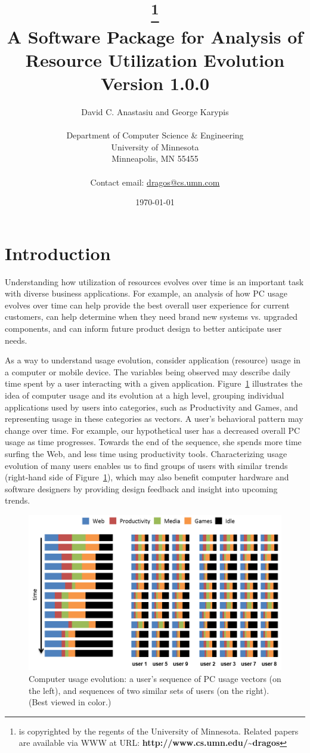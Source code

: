\documentclass[]{article}
\title{{\Huge \orion}\thanks{%
\orion is copyrighted by the regents of the University of Minnesota.
Related papers are available via WWW at URL: {\bf\sf
http://www.cs.umn.edu/\~{}dragos} }\\%
 {\LARGE A Software Package for Analysis of Resource Utilization Evolution}\\
 {\Large Version 1.0.0}}
\author{David C. Anastasiu and George Karypis \\ \\
	Department of Computer Science \& Engineering\\University of
Minnesota\\ Minneapolis, MN 55455 \\ \\ Contact email:
\href{mailto:dragos@cs.umn.com}{dragos@cs.umn.com} }
\date\today
\begin{document}
\maketitle
\clearpage

\tableofcontents
\clearpage



\section{Introduction}

Understanding how utilization of resources evolves over time is an important
task with diverse business applications. For example, an analysis of how PC
usage evolves over time can help provide the best overall user experience for
current customers, can help determine when they need brand new systems vs.
upgraded components, and can inform future product design to better anticipate
user needs.

As a way to understand usage evolution, consider application (resource) usage in
a computer or mobile device. The variables being observed may describe daily time
spent by a user interacting with a given application.
Figure~\ref{fig:usage-evolution} illustrates the idea of computer usage and its
evolution at a high level, grouping individual applications used by users into
categories, such as Productivity and Games, and representing usage in these
categories as vectors. A user's behavioral pattern may change over time. For
example, our hypothetical user has a decreased overall PC usage as time
progresses. Towards the end of the sequence, she spends more time surfing the
Web, and less time using productivity tools. Characterizing usage evolution of
many users enables us to find groups of users with similar trends (right-hand
side of Figure~\ref{fig:usage-evolution}), which may also benefit computer
hardware and software designers by providing design feedback and insight into upcoming
trends.

\begin{figure}[h] \centering
    \includegraphics[width=0.7\columnwidth]{usage3}
    \caption{Computer usage evolution:  a user's sequence of PC usage vectors
    (on the left), and sequences of two similar sets of users (on the right).
    (Best viewed in color.)}
\label{fig:usage-evolution}
\end{figure}
\end{document}
